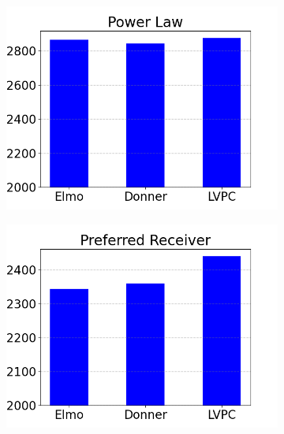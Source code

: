   \begin{figure}
  \begin{subfigure}{.3293\textwidth}
  \includegraphics[width=\textwidth]{../simulation/Delays_power_law.png}
  \end{subfigure}
  \begin{subfigure}{.3293\textwidth}
  \includegraphics[width=\textwidth]{../simulation/Delays_preferred_receiver.png}
  \end{subfigure}
  \begin{subfigure}{.3293\textwidth}

\end{subfigure}
\end{figure}
